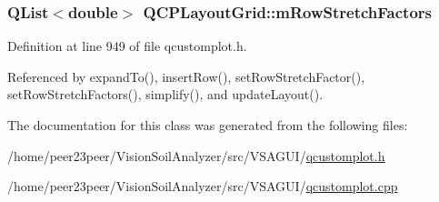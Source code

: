 \subsubsection[{m\+Row\+Stretch\+Factors}]{\setlength{\rightskip}{0pt plus 5cm}Q\+List$<$double$>$ Q\+C\+P\+Layout\+Grid\+::m\+Row\+Stretch\+Factors\hspace{0.3cm}{\ttfamily [protected]}}\label{class_q_c_p_layout_grid_a36c85a7eaf342680fb9b8a4977486f16}


Definition at line 949 of file qcustomplot.\+h.



Referenced by expand\+To(), insert\+Row(), set\+Row\+Stretch\+Factor(), set\+Row\+Stretch\+Factors(), simplify(), and update\+Layout().



The documentation for this class was generated from the following files\+:\begin{DoxyCompactItemize}
\item 
/home/peer23peer/\+Vision\+Soil\+Analyzer/src/\+V\+S\+A\+G\+U\+I/\hyperlink{qcustomplot_8h}{qcustomplot.\+h}\item 
/home/peer23peer/\+Vision\+Soil\+Analyzer/src/\+V\+S\+A\+G\+U\+I/\hyperlink{qcustomplot_8cpp}{qcustomplot.\+cpp}\end{DoxyCompactItemize}
